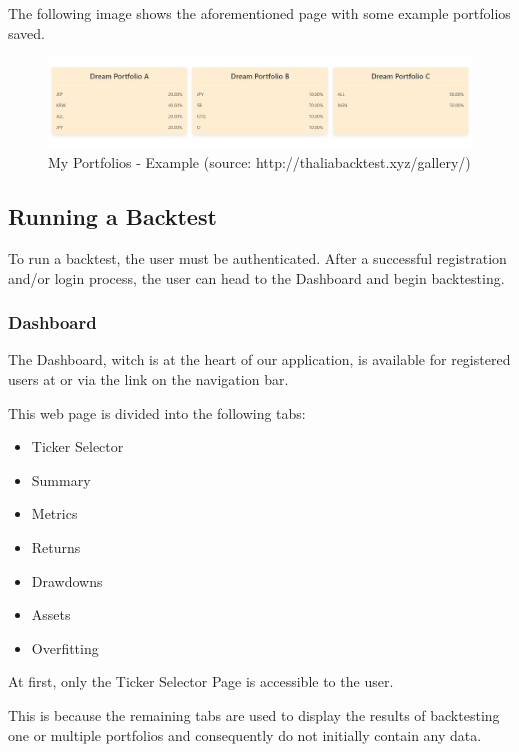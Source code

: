 \documentclass[main.tex]{subfiles}
\begin{document}
The following image shows the aforementioned page with some example portfolios saved.
\begin{figure}[H]
   \centering
   \includegraphics[width=\textwidth]{08Appendices/081User/081Pictures/my_portfolios.png}
   \caption{My Portfolios - Example (source: http://thaliabacktest.xyz/gallery/)}
\end{figure}

\subsection{Running a Backtest}

To run a backtest, the user must be authenticated. After a successful registration and/or login process, the user can head to the Dashboard and begin backtesting.

\subsubsection{Dashboard}

The Dashboard, witch is at the heart of our application, is available for registered users at  or via the link on the navigation bar.

This web page is divided into the following tabs:

\begin{itemize}
    \item Ticker Selector
    \item Summary
    \item Metrics
    \item Returns 
    \item Drawdowns
    \item Assets
    \item Overfitting
\end{itemize}

At first, only the Ticker Selector Page is accessible to the user. 

This is because the remaining tabs are used to display the results of backtesting one or multiple portfolios and consequently do not initially contain any data.
\end{document}
